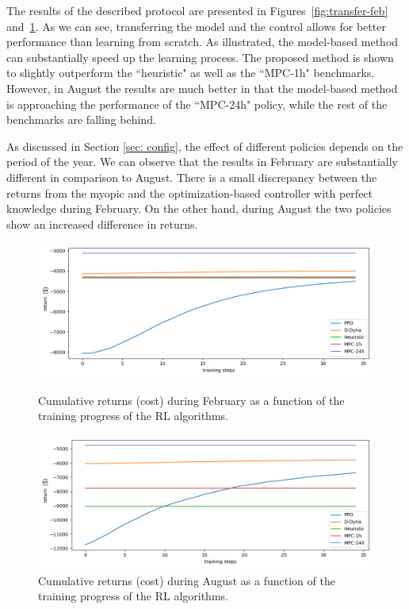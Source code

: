 \documentclass{article}
\begin{document}
    The results of the described protocol are presented in Figures~\ref{fig:transfer-feb} and~\ref{fig:transfer-aug}. As we can see, transferring the model and the control allows for better performance than learning from scratch. As illustrated, the model-based method can substantially speed up the learning process. The proposed method is shown to slightly outperform the ``heuristic" as well as the ``MPC-1h" benchmarks. However, in August the results are much better in that the model-based method is approaching the performance of the ``MPC-24h" policy, while the rest of the benchmarks are falling behind. 
    
    As discussed in Section \ref{sec: config}, the effect of different policies depends on the period of the year. We can observe that the results in February are substantially different in comparison to August. There is a small discrepancy between the returns from the myopic and the optimization-based controller with perfect knowledge during February. On the other hand, during August the two policies show an increased difference in returns. 


    \begin{figure}
     	\centering
     	\begin{minipage}{0.5\textwidth}
     		\centering
     		\includegraphics[width=1.05\textwidth]{MicroGrid-Feb-v0.png}
     		\caption{Cumulative returns (cost) during February as a function of the training progress of the RL algorithms.}
			\label{fig:transfer-feb}
     	\end{minipage} \hfill
     	\begin{minipage}{0.5\textwidth}
     		\centering
     		\includegraphics[width=1.05\textwidth]{MicroGrid-Aug-v0.png}
     		\caption{Cumulative returns (cost) during August as a function of the training progress of the RL algorithms.}
			\label{fig:transfer-aug}
     	\end{minipage}
     
     \end{figure}
\end{document}
